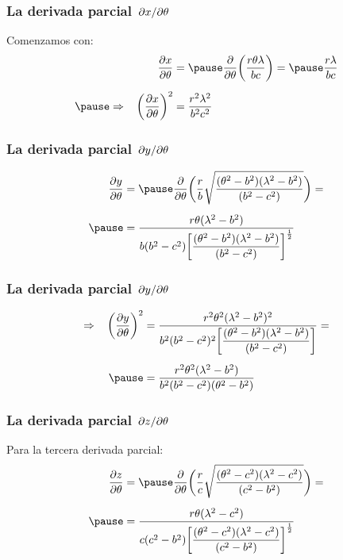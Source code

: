 \documentclass[12pt]{beamer}
\begin{document}
\begin{frame}
\frametitle{La derivada parcial $\pdv*{x}{\theta}$}
Comenzamos con:
\pause
\begin{eqnarray*}
\begin{aligned}
\pdv{x}{\theta} &= \pause \displaystyle \pdv{\theta} \bigg( \dfrac{r \theta \lambda}{b c} \bigg) = \pause \dfrac{r \lambda}{b c} \\[0.5em] \pause
\Rightarrow \hspace{0.3cm} \bigg( \pdv{x}{\theta} \bigg)^{2} &= \dfrac{r^{2} \lambda^{2}}{b^{2} c^{2}}
\end{aligned}
\end{eqnarray*}
\end{frame}
\begin{frame}
\frametitle{La derivada parcial $\pdv*{y}{\theta}$}
\begin{eqnarray*}
\begin{aligned}
\pdv{y}{\theta} &= \pause \pdv{\theta} \bigg( \dfrac{r}{b} \sqrt{\dfrac{ (\theta^{2} - b^{2}) (\lambda^{2} - b^{2}) }{(b^{2} - c^{2})}} \bigg) = \\[0.5em] \pause
&= \dfrac{r \theta (\lambda^{2} - b^{2})}{b (b^{2} -c^{2}) \bigg[ \dfrac{(\theta^{2} - b^{2})(\lambda^{2} - b^{2})}{(b^{2} - c^{2})} \bigg]^{\frac{1}{2}}}
\end{aligned}
\end{eqnarray*}  
\end{frame}
\begin{frame}
\frametitle{La derivada parcial $\pdv*{y}{\theta}$}
\begin{eqnarray*}
\begin{aligned}
\Rightarrow \hspace{0.3cm} \bigg( \pdv{y}{\theta} \bigg)^{2} &= \dfrac{r^{2} \theta^{2} (\lambda^{2} - b^{2})^{2}}{b^{2} (b^{2} -c^{2})^{2} \bigg[ \dfrac{(\theta^{2} - b^{2})(\lambda^{2} - b^{2})}{(b^{2} - c^{2})} \bigg]} = \\[0.5em] \pause
&= \dfrac{r^{2} \theta^{2} (\lambda^{2} - b^{2})}{b^{2} (b^{2} - c^{2}) (\theta^{2} - b^{2})}
\end{aligned}
\end{eqnarray*}  
\end{frame}
\begin{frame}
\frametitle{La derivada parcial $\pdv*{z}{\theta}$}
Para la tercera derivada parcial:
\pause
\begin{eqnarray*}
\begin{aligned}
\pdv{z}{\theta} &= \pause \pdv{\theta} \bigg( \dfrac{r}{c} \sqrt{\dfrac{(\theta^{2} - c^{2})(\lambda^{2} - c^{2})}{(c^{2} - b^{2})}} \bigg) = \\[0.5em] \pause
&= \dfrac{r \theta (\lambda^{2} - c^{2})}{c (c^{2} - b^{2}) \bigg[ \dfrac{(\theta^{2} - c^{2})(\lambda^{2} - c^{2})}{(c^{2} - b^{2})} \bigg]^{\frac{1}{2}}}
\end{aligned}
\end{eqnarray*}
\end{frame}
\end{document}
